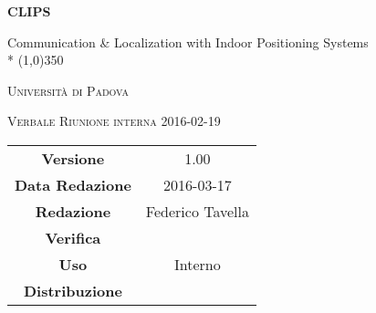 \documentclass[a4paper,12pt]{article}
\author{Federico Tavella}
\date{17/03/2016}
\begin{document}
\begin{titlepage}
	\centering
	{\huge\bfseries CLIPS\par}
	Communication \& Localization with Indoor Positioning Systems \\*
	\line(1,0){350} \\
	{\scshape\LARGE Università di Padova \par}
	\vspace{1cm}
	{\scshape\Large Verbale Riunione interna 2016-02-19 \par}
	\logo
	\newpage
	\begin{tabular}{c|c}
		{\hfill \textbf{Versione}} 			& 1.00				\\
		{\hfill\textbf{Data Redazione}} 	& 2016-03-17  		\\
		{\hfill\textbf{Redazione}} 			& Federico Tavella	\\
		{\hfill\textbf{Verifica}} 			& 		\\
		{\hfill\textbf{Uso}} 				& Interno			\\
		{\hfill\textbf{Distribuzione}} 		& \leaf\			\\
	\end{tabular}
\end{titlepage}
	
	\newpage

	
	\label{LastFrontPage}
	

	\newpage
	
	\pagestyle{mymain}
	
	
		

	
		
	
		
	
		\newpage
		
				
	\label{LastPage}
\end{document}
